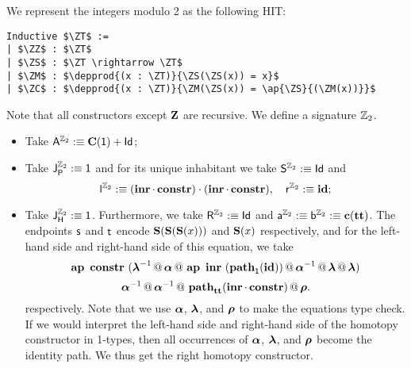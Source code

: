 \begin{example}
\label{ex:mod}
We represent the integers modulo 2 as the following HIT:
\begin{lstlisting}[mathescape=true]
Inductive $\ZT$ :=
| $\ZZ$ : $\ZT$
| $\ZS$ : $\ZT \rightarrow \ZT$
| $\ZM$ : $\depprod{(x : \ZT)}{\ZS(\ZS(x)) = x}$
| $\ZC$ : $\depprod{(x : \ZT)}{\ZM(\ZS(x)) = \ap{\ZS}{(\ZM(x))}}$
\end{lstlisting}
Note that all constructors except $\ZZ$ are recursive.
We define a signature $\ZT$.
\begin{itemize}
	\item Take $\pointconstr[\ZT] \eqdef \sumP{\constantP{\unit}}{\idP}$;
	\item Take $\pathlabel[\ZT] \eqdef \unit$ and for its unique inhabitant we take $\patharg[\ZT] \eqdef \idP$ and
	\[
	\pathleft[\ZT] \eqdef \comp{(\comp{\inre}{\constr})}{(\comp{\inre}{\constr})}, \quad
	\pathright[\ZT] \eqdef \idENA;
	\]
	\item Take $\homotlabel[\ZT] \eqdef \unit$.
	Furthermore, we take $\homotpointarg[\ZT] \eqdef \idP$ and $\pathargleft[\ZT] \eqdef \pathargright[\ZT] \eqdef \Ce(\unitt)$.
	The endpoints $\homotpathleft$ and $\homotpathright$ encode $\ZS(\ZS(\ZS(x)))$ and $\ZS(x)$ respectively,
	and for the left-hand side and right-hand side of this equation, we take
	\[
	\hap{\constr}{(\hconcat{\hinv{\hlunitN}}{\hconcat{\hassocN}{\hconcat{\hap{\inre}{(\hconstr{\unit}{\idENA})}}{\hconcat{\hinv{\hassocN}}{\hconcat{\hlunitN}{\hlunitN}}}}})}
	\]
	\[
	\hconcat{\hinv{\hassocN}}{\hconcat{\hinv{\hassocN}}{\hconcat{\hconstr{\unitt}{\comp{\inre}{\constr}}}{\hrunitN}}}.
	\]
	respectively.
	Note that we use $\hassocN$, $\hlunitN$, and $\hrunitN$ to make the equations type check.
	If we would interpret the left-hand side and right-hand side of  the homotopy constructor in 1-types,
	then all occurrences of $\hassocN$, $\hlunitN$, and $\hrunitN$ become the identity path.
	We thus get the right homotopy constructor.
\end{itemize}
\end{example}


